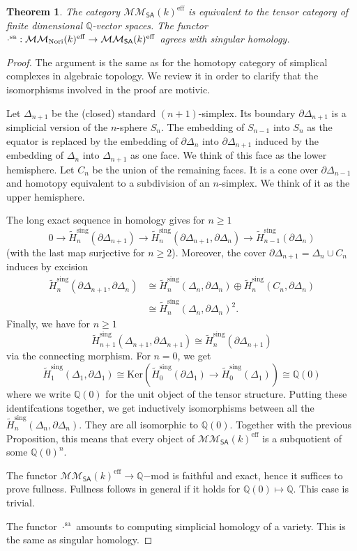 \documentclass[11pt,a4paper]{amsart}
\newtheorem{thm}[lemma]{Theorem}
\theoremstyle{definition}
\newcommand{\MMN}{\mathcal{MM}_{\rm Nori}}
\newcommand{\MMSA}{\mathcal{MM}_{\SA}}
\newcommand{\isom}{\cong}
\renewcommand{\ker}{\mathrm{Ker}}
\newcommand{\eff}{\mathrm{eff}}
\newcommand{\Qmod}{\Q\mathrm{-mod}}
\newcommand{\sa}{\mathrm{sa}}
\newcommand{\sing}{\mathrm{sing}}
\newcommand{\Hsingtilde}{\tilde{H}^\sing}
\newcommand{\SA}{\mathsf{SA}}
\newcommand{\Q}{\mathbb{Q}}
\begin{document}
\begin{thm}
The category $\MMSA(k)^\eff$ is equivalent to the tensor category of finite dimensional $\Q$-vector spaces. The functor $\cdot^\sa:\MMN(k)^\eff\to\MMSA(k)^\eff$
agrees with singular homology.
\end{thm}
\begin{proof}
The argument is the same as for the homotopy category of simplical complexes in algebraic topology. We review it in order to clarify that the isomorphisms involved in the proof are motivic.

Let $\Delta_{n+1}$ be the (closed) standard $(n+1)$-simplex. Its boundary $\partial \Delta_{n+1}$ is
a simplicial version of the $n$-sphere $S_n$. The embedding
of $S_{n-1}$ into $S_n$ as the equator is replaced by the embedding of
$\partial\Delta_{n}$ into $\partial\Delta_{n+1}$ induced by the embedding
of $\Delta_n$ into $\Delta_{n+1}$ as one face. We think of this face as the lower hemisphere. Let $C_n$ be the union of the remaining faces. It is a cone over $\partial \Delta_{n-1}$ and homotopy equivalent to a subdivision of an $n$-simplex. We think of it as the upper hemisphere.

The long exact sequence in homology gives for $n\geq 1$
\[0\to\Hsingtilde_{n}(\partial\Delta_{n+1})\to  \Hsingtilde_{n}(\partial \Delta_{n+1},\partial\Delta_{n})\to
\Hsingtilde_{n-1}(\partial\Delta_{n})\]
(with the last map surjective for $n\geq 2$).
Moreover, the cover $\partial \Delta_{n+1}=\Delta_n\cup C_n$ induces by excision
\begin{align*}
 \Hsingtilde_{n}(\partial \Delta_{n+1},\partial\Delta_n)&\isom
   \Hsingtilde_n(\Delta_n,\partial\Delta_n)\oplus \Hsingtilde_n(C_n,\partial\Delta_n)\\
&\isom \Hsingtilde_n(\Delta_n,\partial \Delta_n)^2.
\end{align*}
Finally, we have for $n\geq 1$
\[ \Hsingtilde_{n+1}(\Delta_{n+1},\partial\Delta_{n+1})\isom \Hsingtilde_n(\partial \Delta_{n+1})\]
via the connecting morphism. For $n=0$, we get
\[ \Hsingtilde_1(\Delta_1,\partial\Delta_1)\isom\ker(\Hsingtilde_0(\partial \Delta_1)\to\Hsingtilde_0(\Delta_1))\isom\Q(0)\]
where we write $\Q(0)$ for the unit object of the tensor structure.
Putting these identifcations together, we get inductively isomorphisms between all the
$\Hsingtilde_n(\Delta_n,\partial\Delta_n)$. They are all isomorphic to $\Q(0)$.
Together with the previous Proposition, this means that every object of
$\MMSA(k)^\eff$ is a subquotient of some $\Q(0)^n$.

The functor $\MMSA(k)^\eff\to \Qmod$ is faithful and exact, hence it suffices to prove fullness. Fullness follows in general if it holds for
$\Q(0)\mapsto \Q$. This case is trivial. 

The functor $\cdot^\sa$ amounts to computing simplicial homology of a variety. This is the same as singular homology.
\end{proof}
\end{document}
